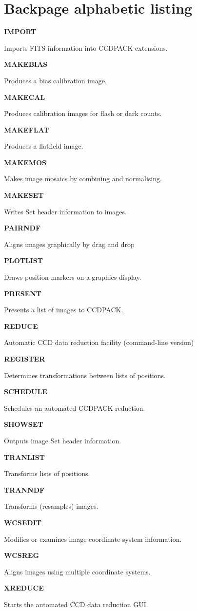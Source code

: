 \documentclass[twoside,11pt]{article}
\newenvironment{latexonly}{}{}
\renewcommand{\_}{\texttt{\symbol{95}}}
\newcommand{\quickdes}[3]{
                         \parbox{1.1in}{\bf #1}
                         \parbox{4.4in}{\raggedright #2 \dotfill}
                         \parbox{0.6in}{\pageref{#3}}
                         \vspace*{0.2in}}
\newcommand{\latexonlysection}[1]{\section{#1}}
\newcommand{\latexonlysection}[1]{#1}
\begin{document}
\begin{latexonly}

\cleardoublepage

\latexonlysection{Backpage alphabetic listing}

%
%

\quickdes{IMPORT}{Imports FITS information into CCDPACK extensions.}{IMPORT}

\quickdes{MAKEBIAS}{Produces a bias calibration image.}{MAKEBIAS}

\quickdes{MAKECAL}{Produces calibration images for flash or dark counts.}
                  {MAKECAL}

\quickdes{MAKEFLAT}{Produces a flatfield image.}
                   {MAKEFLAT}

\quickdes{MAKEMOS}{Makes image mosaics by combining and normalising.}
                  {MAKEMOS}

\quickdes{MAKESET}{Writes Set header information to images.}{MAKESET}

\quickdes{PAIRNDF}{Aligns images graphically by drag and drop}{PAIRNDF}

\quickdes{PLOTLIST}{Draws position markers on a graphics display.}
                   {PLOTLIST}

\quickdes{PRESENT}{Presents a list of images to CCDPACK.}{PRESENT}

\quickdes{REDUCE}{Automatic CCD data reduction facility (command-line version)}
                 {REDUCE}

\quickdes{REGISTER}{Determines transformations between lists of positions.}
                   {REGISTER}

\quickdes{SCHEDULE}{Schedules an automated CCDPACK reduction.}{SCHEDULE}

\quickdes{SHOWSET}{Outputs image Set header information.}{SHOWSET}

\quickdes{TRANLIST}{Transforms lists of positions.}
                   {TRANLIST}

\quickdes{TRANNDF}{Transforms (resamples) images.}
                  {TRANNDF}

\quickdes{WCSEDIT}{Modifies or examines image coordinate system information.}
                  {WCSEDIT}

\quickdes{WCSREG}{Aligns images using multiple coordinate systems.}
                 {WCSREG}

\quickdes{XREDUCE}{Starts the automated CCD data reduction GUI.}{XREDUCE}


\end{latexonly}
\end{document}
